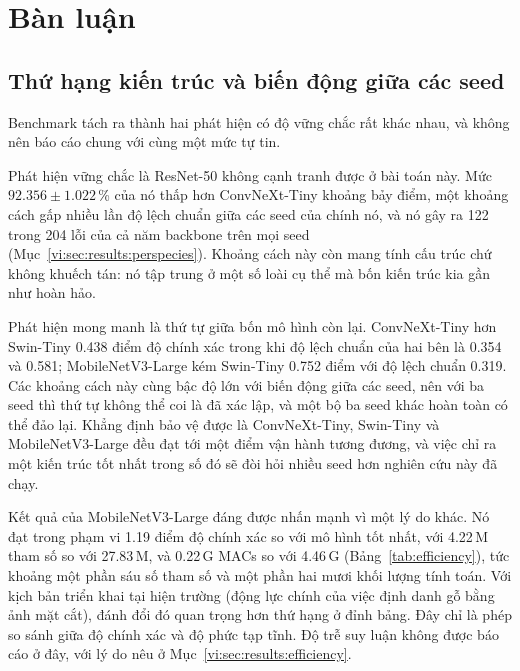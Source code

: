 %
%
%

\section{Bàn luận}
\label{vi:sec:discussion}

\subsection{Thứ hạng kiến trúc và biến động giữa các seed}
\label{vi:sec:discussion:ranking}

Benchmark tách ra thành hai phát hiện có độ vững chắc rất khác nhau, và không
nên báo cáo chung với cùng một mức tự tin.

Phát hiện vững chắc là ResNet-50 không cạnh tranh được ở bài toán này. Mức
$92.356 \pm 1.022$\,\% của nó thấp hơn ConvNeXt-Tiny khoảng bảy điểm, một
khoảng cách gấp nhiều lần độ lệch chuẩn giữa các seed của chính nó, và nó gây
ra 122 trong 204 lỗi của cả năm backbone trên mọi seed
(Mục~\ref{vi:sec:results:perspecies}). Khoảng cách này còn mang tính cấu trúc
chứ không khuếch tán: nó tập trung ở một số loài cụ thể mà bốn kiến trúc kia
gần như hoàn hảo.

Phát hiện mong manh là thứ tự giữa bốn mô hình còn lại. ConvNeXt-Tiny hơn
Swin-Tiny 0.438 điểm độ chính xác trong khi độ lệch chuẩn của hai bên là 0.354
và 0.581; MobileNetV3-Large kém Swin-Tiny 0.752 điểm với độ lệch chuẩn 0.319.
Các khoảng cách này cùng bậc độ lớn với biến động giữa các seed, nên với ba
seed thì thứ tự không thể coi là đã xác lập, và một bộ ba seed khác hoàn toàn
có thể đảo lại. Khẳng định bảo vệ được là ConvNeXt-Tiny, Swin-Tiny và
MobileNetV3-Large đều đạt tới một điểm vận hành tương đương, và việc chỉ ra
một kiến trúc tốt nhất trong số đó sẽ đòi hỏi nhiều seed hơn nghiên cứu này đã
chạy.

Kết quả của MobileNetV3-Large đáng được nhấn mạnh vì một lý do khác. Nó đạt
trong phạm vi 1.19 điểm độ chính xác so với mô hình tốt nhất, với 4.22\,M tham
số so với 27.83\,M, và 0.22\,G MACs so với 4.46\,G
(Bảng~\ref{tab:efficiency}), tức khoảng một phần sáu số tham số và một phần
hai mươi khối lượng tính toán. Với kịch bản triển khai tại hiện trường (động
lực chính của việc định danh gỗ bằng ảnh mặt cắt), đánh đổi đó quan trọng hơn
thứ hạng ở đỉnh bảng. Đây chỉ là phép so sánh giữa độ chính xác và độ phức tạp
tĩnh. Độ trễ suy luận không được báo cáo ở đây, với lý do nêu ở
Mục~\ref{vi:sec:results:efficiency}.

